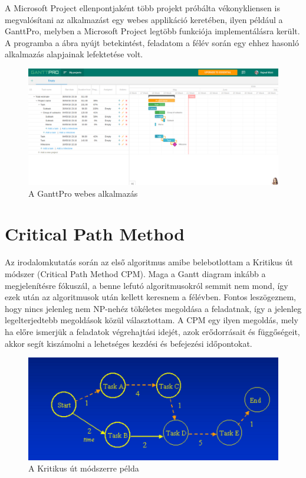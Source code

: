 A Microsoft Project ellenpontjaként több projekt próbálta vékonykliensen is megvalósítani az alkalmazást egy webes applikáció keretében, ilyen például a GanttPro, melyben a Microsoft Project legtöbb funkciója implementálásra került. A programba a  ábra nyújt betekintést, feladatom a félév során egy ehhez hasonló alkalmazás alapjainak lefektetése volt.\cite{GanttPro}

\begin{figure}[!ht]
\centering
\includegraphics[width=\textwidth, keepaspectratio]{figures/ganntpro.png}
\caption{A GanttPro webes alkalmazás} 
\label{fig:GanttPro}
\end{figure} 

\section{Critical Path Method}
\hspace{2mm} \indent Az irodalomkutatás során az első algoritmus amibe belebotlottam a Kritikus út módszer (Critical Path Method CPM). Maga a Gantt diagram inkább a megjelenítésre fókuszál, a benne lefutó algoritmusokról semmit nem mond, így ezek után az algoritmusok után kellett keresnem a félévben.  Fontos leszögeznem, hogy nincs jelenleg nem NP-nehéz tökéletes megoldása a feladatnak, így a jelenleg legelterjedtebb megoldások közül választottam. A CPM egy ilyen megoldás, mely ha előre ismerjük a feladatok végrehajtási idejét, azok erődorrásait és függőségeit, akkor segít kiszámolni a lehetséges kezdési és befejezési időpontokat. \cite{CPM}

\begin{figure}[!ht]
\centering
\includegraphics[width=\textwidth, keepaspectratio]{figures/cpm.png}
\caption{A Kritikus út módszerre példa} 
\label{fig:CPM}
\end{figure} 

